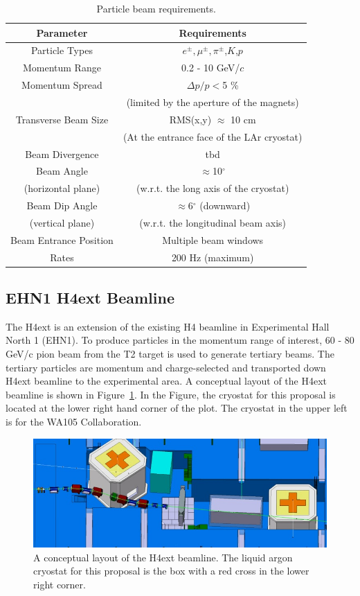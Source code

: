 \begin{table}[h]
\centering
\begin{tabular}{|c|c|}
\hline
\textbf{Parameter } & \textbf{Requirements}  \\ \hline
  Particle Types        & $e^\pm,\mu^\pm,\pi^\pm$,$K$,$p$  \\ \hline
  Momentum Range   & 0.2 - 10 GeV/$c$ \\ \hline
  Momentum Spread   & $\Delta p/p  < $5 \% \\
  & (limited by the aperture of the magnets)  \\ \hline
  Transverse Beam Size   & RMS(x,y) $\approx$ 10 cm  \\
  & (At the entrance face of the LAr cryostat) \\ \hline
  Beam Divergence & tbd   \\ \hline
  Beam Angle &  $\approx$10$^{\circ}$ \\
  (horizontal plane) &  (w.r.t. the long axis of the cryostat)\\ \hline
  Beam Dip Angle &  $\approx$6$^\circ$ (downward)   \\ 
  (vertical plane) & (w.r.t. the longitudinal beam axis) \\ \hline
  Beam Entrance Position & Multiple beam windows    \\ \hline
  Rates & 200 Hz (maximum)    \\ \hline
\end{tabular}
\caption{Particle beam requirements.}
\label{table:beamspecs}
\end{table}

\subsection{EHN1 H4ext Beamline}
The H4ext is an extension of the existing H4 beamline in Experimental Hall North 1 (EHN1).  To produce particles in the momentum range of interest, 60 - 80 GeV/c pion beam from the T2 target is used to generate tertiary beams. The tertiary particles are momentum and charge-selected and transported down H4ext beamline to the experimental area. A conceptual layout of the H4ext beamline is shown in Figure~\ref{fig:H4extPrelim}.  In the Figure, the cryostat for this proposal is located at the lower right hand corner of the plot. The cryostat in the upper left is for the WA105 Collaboration.

\begin{figure}[h]
  \centering
\includegraphics[scale=0.7]{figures/EHN1Ext_Prelim.jpg}
  \caption{A conceptual layout of the H4ext beamline. The liquid argon cryostat for this proposal is the box with a red cross in the lower right corner.  }
  \label{fig:H4extPrelim}
\end{figure}

